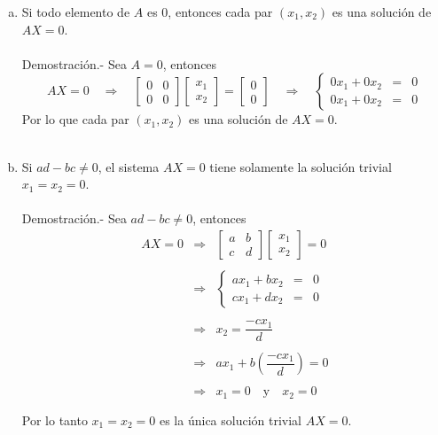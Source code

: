 \begin{enumerate}[\bfseries 1.]
	\begin{enumerate}[(a)]

	    \item Si todo elemento de $A$ es $0$, entonces cada par $(x_1,x_2)$ es una solución de $AX=0$.\\\\
		Demostración.-\; Sea $A=0$, entonces
		$$AX=0 \quad \Rightarrow \quad \left[\begin{array}{*{2}{r}}
		    0 & 0 \\
		    0 & 0
		\end{array}\right]
		\left[\begin{array}{c}
		    x_1 \\
		    x_2
		\end{array}\right] = 
		\left[\begin{array}{c}
		    0 \\
		    0
		\end{array}\right] \quad \Rightarrow \quad 
		\left\{\begin{array}{rcl}
		    0x_1+0x_2 & = & 0 \\
		    0x_1+0x_2 & = & 0 
		\end{array}\right.$$
		Por lo que cada par $(x_1,x_2)$ es una solución de $AX=0$.\\\\

	    \item Si $ad-bc\neq 0$, el sistema $AX=0$ tiene solamente la solución trivial $x_1=x_2=0$.\\\\
		Demostración.-\; Sea $ad-bc\neq 0$, entonces
		$$\begin{array}{rcl}
		    AX=0 &\Rightarrow&  \left[\begin{array}{*{2}{r}}
		    a & b \\
		    c & d
		\end{array}\right]
		\left[\begin{array}{c}
		    x_1 \\
		    x_2
		\end{array}\right] = 0\\\\
			 &\Rightarrow& 
		\left\{\begin{array}{rcl}
		    ax_1+bx_2 & = & 0 \\
		    cx_1+dx_2 & = & 0
		\end{array}\right.\\\\
			 & \Rightarrow &
		    x_2  =  \dfrac{-cx_1}{d}\\\\
			 & \Rightarrow &
			 ax_1+b\left(\dfrac{-cx_1}{d}\right)=0\\\\
			 & \Rightarrow &
			 x_1=0 \quad \mbox{y}\quad x_2=0\\\\
		\end{array}
		$$
		Por lo tanto $x_1=x_2=0$ es la única solución trivial $AX=0$.\\\\


\end{enumerate}
\end{enumerate}
